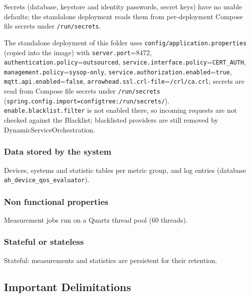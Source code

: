 \documentclass[a4paper]{arrowhead}
\begin{document}
Secrets (database, keystore and identity passwords, secret keys) have no usable defaults; the standalone deployment reads them from per-deployment Compose file secrets under \texttt{/\allowbreak{}run/\allowbreak{}secrets}.

The standalone deployment of this folder uses \texttt{config/\allowbreak{}application.\allowbreak{}properties} (copied into the image) with \texttt{server.\allowbreak{}port}=8472, \texttt{authentication.\allowbreak{}policy}=\texttt{outsourced}, \texttt{service.\allowbreak{}interface.\allowbreak{}policy}=\texttt{CERT\_AUTH}, \texttt{management.\allowbreak{}policy}=\texttt{sysop-\allowbreak{}only}, \texttt{service.\allowbreak{}authorization.\allowbreak{}enabled}=\texttt{true}, \texttt{mqtt.\allowbreak{}api.\allowbreak{}enabled}=\texttt{false}, \texttt{arrowhead.\allowbreak{}ssl.\allowbreak{}crl-\allowbreak{}file}=\texttt{/\allowbreak{}crl/\allowbreak{}ca.\allowbreak{}crl}; secrets are read from Compose file secrets under \texttt{/\allowbreak{}run/\allowbreak{}secrets} (\texttt{spring.\allowbreak{}config.\allowbreak{}import=\allowbreak{}configtree:\allowbreak{}/\allowbreak{}run/\allowbreak{}secrets/}). \texttt{enable.\allowbreak{}blacklist.\allowbreak{}filter} is not enabled there, so incoming requests are not checked against the Blacklist; blacklisted providers are still removed by Dynamic\allowbreak{}Service\allowbreak{}Orchestration.

\subsubsection{Data stored by the system}

Devices, systems and statistic tables per metric group, and log entries (database \texttt{ah\_\allowbreak{}device\_\allowbreak{}qos\_\allowbreak{}evaluator}).

\subsubsection{Non functional properties}

Measurement jobs run on a Quartz thread pool (60 threads).

\subsubsection{Stateful or stateless}

Stateful: measurements and statistics are persistent for their retention.

\subsection{Important Delimitations}
\label{sec:delimitations}
\end{document}

